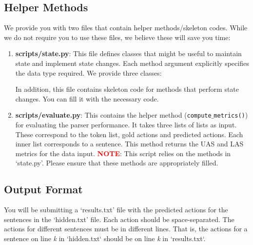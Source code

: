 \subsection{Helper Methods}
We provide you with two files that contain helper methods/skeleton codes. While we do not require you to use these files, we believe these will save you time:
\begin{enumerate}
    \item \textbf{scripts/state.py}: This file defines classes that might be useful to maintain state and implement state changes. Each method argument explicitly specifies the data type required. We provide three classes: 
    In addition, this file contains skeleton code for methods that perform state changes. You can fill it with the necessary code. 
    \item \textbf{scripts/evaluate.py}: This contains the helper method (\texttt{compute$\_$metrics()}) for evaluating the parser performance. It takes three lists of lists as input. These correspond to the token list, gold actions and predicted actions. Each inner list corresponds to a sentence. This method returns the UAS and LAS metrics for the data input. \textcolor{red}{\textbf{NOTE}}: This script relies on the methods in `state.py'. Please ensure that these methods are appropriately filled.
\end{enumerate}

\subsection{Output Format}
You will be submitting a `results.txt' file with the predicted actions for the sentences in the `hidden.txt' file. Each action should be space-separated. The actions for different sentences must be in different lines. That is, the actions for a sentence on line \emph{k} in `hidden.txt` should be on line \emph{k} in `results.txt`.


